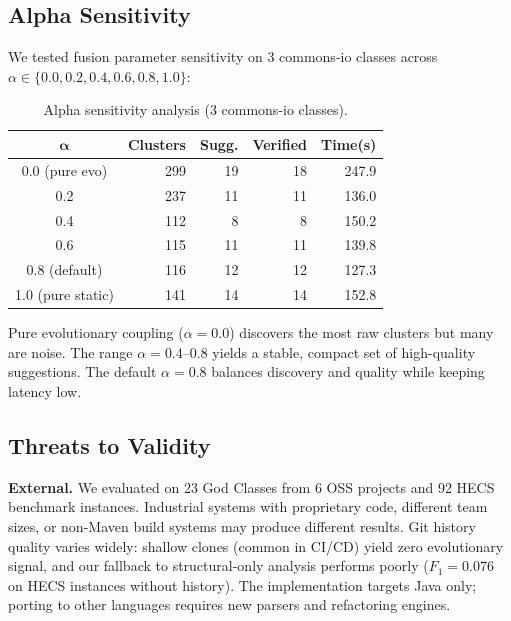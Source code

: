 \documentclass[sigconf]{acmart}
\begin{document}
\subsection{Alpha Sensitivity}
\label{sec:alpha}

We tested fusion parameter sensitivity on 3 commons-io classes across
$\alpha \in \{0.0, 0.2, 0.4, 0.6, 0.8, 1.0\}$:

\begin{table}[t]
\centering\small
\caption{Alpha sensitivity analysis (3 commons-io classes).}
\label{tab:alpha}
\begin{tabular}{@{}crrrr@{}}
\toprule
$\boldsymbol{\alpha}$ & \textbf{Clusters} & \textbf{Sugg.} & \textbf{Verified} & \textbf{Time(s)} \\
\midrule
0.0 (pure evo)    & 299 & 19 & 18 & 247.9 \\
0.2               & 237 & 11 & 11 & 136.0 \\
0.4               & 112 &  8 &  8 & 150.2 \\
0.6               & 115 & 11 & 11 & 139.8 \\
0.8 (default)     & 116 & 12 & 12 & 127.3 \\
1.0 (pure static) & 141 & 14 & 14 & 152.8 \\
\bottomrule
\end{tabular}
\end{table}

Pure evolutionary coupling ($\alpha{=}0.0$) discovers the most raw clusters but
many are noise. The range $\alpha{=}0.4$--$0.8$ yields a stable, compact set of
high-quality suggestions. The default $\alpha{=}0.8$ balances discovery and
quality while keeping latency low.

\subsection{Threats to Validity}
\label{sec:threats}

\textbf{External.}  We evaluated on 23 God Classes from 6 OSS projects and 92
HECS benchmark instances. Industrial systems with proprietary code, different
team sizes, or non-Maven build systems may produce different results. Git
history quality varies widely: shallow clones (common in CI/CD) yield zero
evolutionary signal, and our fallback to structural-only analysis performs
poorly ($F_1{=}0.076$ on HECS instances without history). The implementation
targets Java only; porting to other languages requires new parsers and
refactoring engines.
\end{document}
